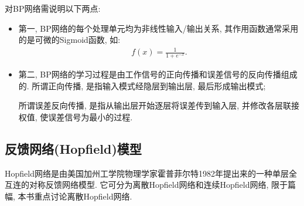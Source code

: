 对BP网络需说明以下两点:
\begin{itemize}
\item 第一, BP网络的每个处理单元均为非线性输入/输出关系, 其作用函数通常采用的是可微的Sigmoid函数, 如:
\begin{align}
    f(x)=\frac{1}{1+e^{-x}}.
\end{align}
\item 第二, BP网络的学习过程是由工作信号的正向传播和误差信号的反向传播组成的. 所谓正向传播, 是指输入模式经隐层到输出层, 最后形成输出模式;
\begin{remark}
    所谓误差反向传播, 是指从输出层开始逐层将误差传到输入层, 并修改各层联接权值, 使误差信号为最小的过程.
\end{remark}
\end{itemize}
\subsection{反馈网络(Hopfield)模型}
Hopfield网络是由美国加州工学院物理学家霍普菲尔特1982年提出来的一种单层全互连的对称反馈网络模型. 它可分为离散Hopfield网络和连续Hopfield网络, 限于篇幅, 本书重点讨论离散Hopfield网络.
